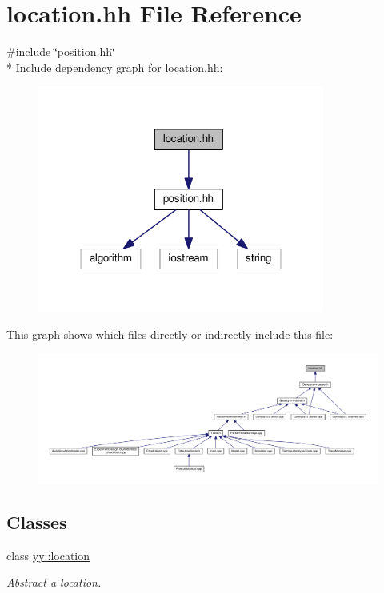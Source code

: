 \hypertarget{location_8hh}{\section{location.\-hh File Reference}
\label{location_8hh}
}
{\ttfamily \#include \char`\"{}position.\-hh\char`\"{}}\\*
Include dependency graph for location.\-hh\-:\nopagebreak
\begin{figure}[H]
\begin{center}
\leavevmode
\includegraphics[width=267pt]{location_8hh__incl}
\end{center}
\end{figure}
This graph shows which files directly or indirectly include this file\-:
\nopagebreak
\begin{figure}[H]
\begin{center}
\leavevmode
\includegraphics[width=350pt]{location_8hh__dep__incl}
\end{center}
\end{figure}
\subsection*{Classes}
\begin{DoxyCompactItemize}
\item 
class \hyperlink{classyy_1_1location}{yy\-::location}
\begin{DoxyCompactList}\small\item\em Abstract a location. \end{DoxyCompactList}\end{DoxyCompactItemize}
